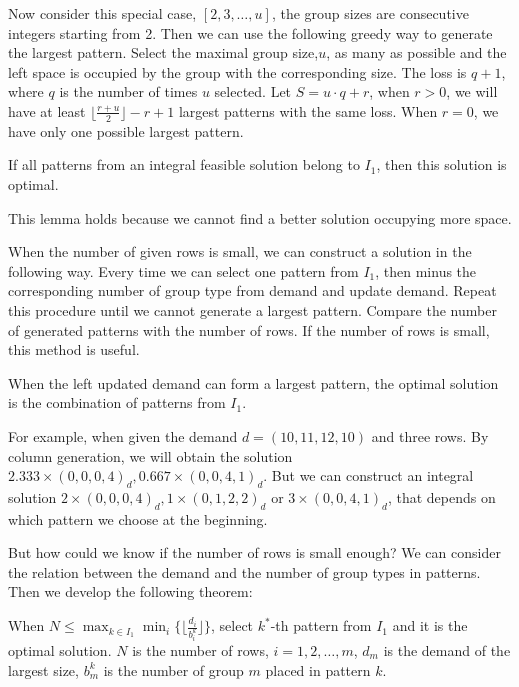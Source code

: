 Now consider this special case, $[2,3,\ldots,u]$, the group sizes are consecutive integers starting from 2. Then we can use the following greedy way to generate the largest pattern. Select the maximal group size,$u$, as many as possible and the left space is occupied by the group with the corresponding size. The loss is $q+1$, where $q$ is the number of times $u$ selected. Let $S = u\cdot q + r$, when $r>0$, we will have at least $\lfloor \frac{r+u}{2} \rfloor -r +1$ largest patterns with the same loss. When $r =0$, we have only one possible largest pattern.

\begin{lem}
If all patterns from an integral feasible solution belong to $I_1$, then this solution is optimal.
\end{lem}

This lemma holds because we cannot find a better solution occupying more space.

When the number of given rows is small, we can construct a solution in the following way. Every time we can select one pattern from $I_1$, then minus the corresponding number of group type from demand and update demand. Repeat this procedure until we cannot generate a largest pattern. Compare the number of generated patterns with the number of rows. If the number of rows is small, this method is useful.

\begin{corollary}
When the left updated demand can form a largest pattern, the optimal solution is the combination of patterns from $I_1$.
\end{corollary}

For example, when given the demand $d = (10,11,12,10)$ and three rows.
By column generation, we will obtain the solution $2.333 \times (0,0,0,4)_d, 0.667 \times (0,0,4,1)_d$. But we can construct an integral solution $2 \times (0,0,0,4)_d, 1 \times (0,1,2,2)_d$ or $3 \times (0,0,4,1)_d$, that depends on which pattern we choose at the beginning.

But how could we know if the number of rows is small enough?
We can consider the relation between the demand and the number of group types in patterns. Then we develop the following theorem:
\begin{thm}\label{I_1}
  When $N \leq \max_{k\in I_1} \min_{i} \{\lfloor \frac{d_i}{b_i^k}\rfloor\}$, select $k^*$-th pattern from $I_1$ and it is the optimal solution.
  $N$ is the number of rows, $i = 1,2,\ldots, m$, $d_m$ is the demand of the largest size, $b_m^k$ is the number of group $m$ placed in pattern $k$.
\end{thm}

